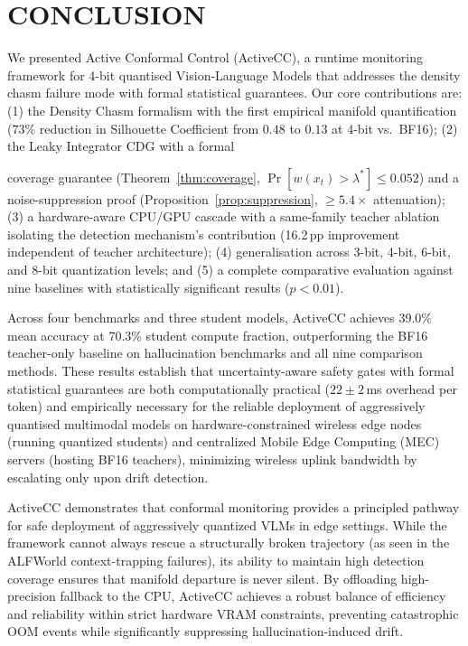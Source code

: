 \documentclass{ieeetmlcn}
\begin{document}
\section{CONCLUSION}
We presented Active Conformal Control (ActiveCC), a runtime monitoring
framework for 4-bit quantised Vision-Language Models that addresses the
density chasm failure mode with formal statistical guarantees. Our core
contributions are: (1) the Density Chasm formalism with the first empirical manifold quantification ($73\%$ reduction in Silhouette Coefficient from $0.48$ to $0.13$ at 4-bit vs.\ BF16); (2) the Leaky Integrator CDG with a formal

coverage guarantee (Theorem~\ref{thm:coverage},
$\Pr[w(x_t)>\lambda^*]\leq 0.052$) and a noise-suppression proof
(Proposition~\ref{prop:suppression}, $\geq 5.4\times$ attenuation); (3)
a hardware-aware CPU/GPU cascade with a same-family teacher ablation
isolating the detection mechanism's contribution (16.2\,pp improvement
independent of teacher architecture); (4) generalisation across 3-bit,
4-bit, 6-bit, and 8-bit quantization levels; and (5) a complete
comparative evaluation against nine baselines with statistically
significant results ($p<0.01$).

Across four benchmarks and three student models, ActiveCC achieves
39.0\% mean accuracy at 70.3\% student compute fraction, outperforming
the BF16 teacher-only baseline on hallucination benchmarks and all nine
comparison methods. These results establish that uncertainty-aware
safety gates with formal statistical guarantees are both computationally
practical ($22\pm2$\,ms overhead per token) and empirically necessary
for the reliable deployment of aggressively quantised multimodal models on
hardware-constrained wireless edge nodes (running quantized students) and centralized Mobile Edge Computing (MEC) servers (hosting BF16 teachers), minimizing wireless uplink bandwidth by escalating only upon drift detection.

ActiveCC demonstrates that conformal monitoring provides a principled pathway for safe deployment of aggressively quantized VLMs in edge settings. While the framework cannot always rescue a structurally broken trajectory (as seen in the ALFWorld context-trapping failures), its ability to maintain high detection coverage ensures that manifold departure is never silent. By offloading high-precision fallback to the CPU, ActiveCC achieves a robust balance of efficiency and reliability within strict hardware VRAM constraints, preventing catastrophic OOM events while significantly suppressing hallucination-induced drift.
\end{document}
